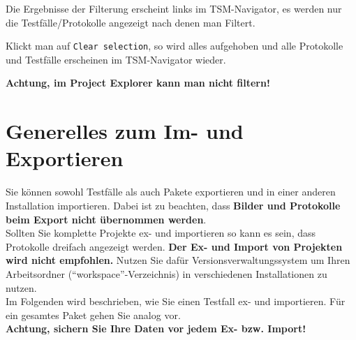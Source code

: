 \documentclass[11pt,a4paper,titlepage]{article}
\begin{document}
Die Ergebnisse der Filterung erscheint links im TSM-Navigator, es werden nur die Testfälle/Protokolle angezeigt nach denen man Filtert.

Klickt man auf \texttt{Clear selection}, so wird alles aufgehoben und alle Protokolle und Testfälle erscheinen im TSM-Navigator wieder.

\textbf{Achtung, im Project Explorer kann man nicht filtern!}

\section{Generelles zum Im- und Exportieren}
Sie können sowohl Testfälle als auch Pakete exportieren und in einer anderen Installation importieren. Dabei ist zu beachten, dass \textbf{Bilder und Protokolle beim Export nicht übernommen werden}.\\
Sollten Sie komplette Projekte ex- und importieren so kann es sein, dass Protokolle dreifach angezeigt werden. \textbf{Der Ex- und Import von Projekten wird nicht empfohlen.} Nutzen Sie dafür Versionsverwaltungssystem um Ihren Arbeitsordner
 ("`workspace"'-Verzeichnis) in verschiedenen Installationen zu nutzen.\\
Im Folgenden wird beschrieben, wie Sie einen Testfall ex- und importieren. Für ein gesamtes Paket gehen Sie analog vor.\\
\vspace{\baselineskip}
\textbf{Achtung, sichern Sie Ihre Daten vor jedem Ex- bzw. Import!}
\end{document}
